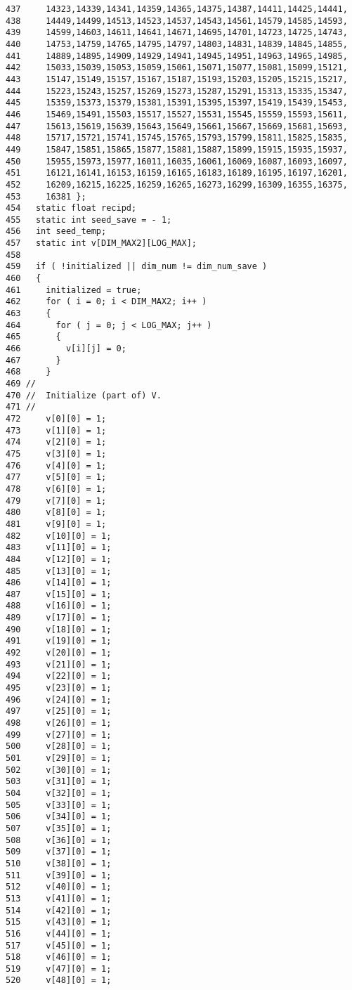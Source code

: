 \begin{Code}
\begin{verbatim}
437     14323,14339,14341,14359,14365,14375,14387,14411,14425,14441,
438     14449,14499,14513,14523,14537,14543,14561,14579,14585,14593,
439     14599,14603,14611,14641,14671,14695,14701,14723,14725,14743,
440     14753,14759,14765,14795,14797,14803,14831,14839,14845,14855,
441     14889,14895,14909,14929,14941,14945,14951,14963,14965,14985,
442     15033,15039,15053,15059,15061,15071,15077,15081,15099,15121,
443     15147,15149,15157,15167,15187,15193,15203,15205,15215,15217,
444     15223,15243,15257,15269,15273,15287,15291,15313,15335,15347,
445     15359,15373,15379,15381,15391,15395,15397,15419,15439,15453,
446     15469,15491,15503,15517,15527,15531,15545,15559,15593,15611,
447     15613,15619,15639,15643,15649,15661,15667,15669,15681,15693,
448     15717,15721,15741,15745,15765,15793,15799,15811,15825,15835,
449     15847,15851,15865,15877,15881,15887,15899,15915,15935,15937,
450     15955,15973,15977,16011,16035,16061,16069,16087,16093,16097,
451     16121,16141,16153,16159,16165,16183,16189,16195,16197,16201,
452     16209,16215,16225,16259,16265,16273,16299,16309,16355,16375,
453     16381 };
454   static float recipd;
455   static int seed_save = - 1;
456   int seed_temp;
457   static int v[DIM_MAX2][LOG_MAX];
458 
459   if ( !initialized || dim_num != dim_num_save )
460   {
461     initialized = true;
462     for ( i = 0; i < DIM_MAX2; i++ )
463     {
464       for ( j = 0; j < LOG_MAX; j++ )
465       {
466         v[i][j] = 0;
467       }
468     }
469 //
470 //  Initialize (part of) V.
471 //
472     v[0][0] = 1;
473     v[1][0] = 1;
474     v[2][0] = 1;
475     v[3][0] = 1;
476     v[4][0] = 1;
477     v[5][0] = 1;
478     v[6][0] = 1;
479     v[7][0] = 1;
480     v[8][0] = 1;
481     v[9][0] = 1;
482     v[10][0] = 1;
483     v[11][0] = 1;
484     v[12][0] = 1;
485     v[13][0] = 1;
486     v[14][0] = 1;
487     v[15][0] = 1;
488     v[16][0] = 1;
489     v[17][0] = 1;
490     v[18][0] = 1;
491     v[19][0] = 1;
492     v[20][0] = 1;
493     v[21][0] = 1;
494     v[22][0] = 1;
495     v[23][0] = 1;
496     v[24][0] = 1;
497     v[25][0] = 1;
498     v[26][0] = 1;
499     v[27][0] = 1;
500     v[28][0] = 1;
501     v[29][0] = 1;
502     v[30][0] = 1;
503     v[31][0] = 1;
504     v[32][0] = 1;
505     v[33][0] = 1;
506     v[34][0] = 1;
507     v[35][0] = 1;
508     v[36][0] = 1;
509     v[37][0] = 1;
510     v[38][0] = 1;
511     v[39][0] = 1;
512     v[40][0] = 1;
513     v[41][0] = 1;
514     v[42][0] = 1;
515     v[43][0] = 1;
516     v[44][0] = 1;
517     v[45][0] = 1;
518     v[46][0] = 1;
519     v[47][0] = 1;
520     v[48][0] = 1;

\end{verbatim}
\end{Code}
